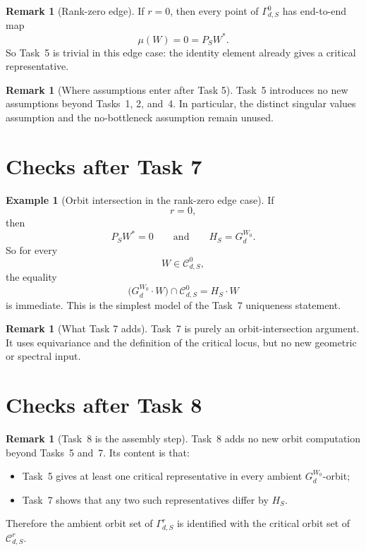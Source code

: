 \documentclass{article}
\theoremstyle{definition}
\newtheorem{remark}[theorem]{Remark}
\newtheorem{example}[theorem]{Example}
\begin{document}
\begin{remark}[Rank-zero edge]
If $r=0$, then every point of $\Gamma_{d,S}^0$ has end-to-end map
\[
\mu(W)=0=P_SW^\ast.
\]
So Task~5 is trivial in this edge case: the identity element already gives a
critical representative.
\end{remark}

\begin{remark}[Where assumptions enter after Task 5]
Task~5 introduces no new assumptions beyond Tasks~1, 2, and~4. In particular,
the distinct singular values assumption and the no-bottleneck assumption remain
unused.
\end{remark}

\section{Checks after Task 7}

\begin{example}[Orbit intersection in the rank-zero edge case]
If
\[
r=0,
\]
then
\[
P_SW^\ast=0
\qquad\text{and}\qquad
H_S=G_d^{W_0}.
\]
So for every
\[
W\in \mathcal C_{d,S}^0,
\]
the equality
\[
\bigl(G_d^{W_0}\cdot W\bigr)\cap \mathcal C_{d,S}^0
=
H_S\cdot W
\]
is immediate. This is the simplest model of the Task~7 uniqueness statement.
\end{example}

\begin{remark}[What Task 7 adds]
Task~7 is purely an orbit-intersection argument. It uses equivariance and the
definition of the critical locus, but no new geometric or spectral input.
\end{remark}

\section{Checks after Task 8}

\begin{remark}[Task~8 is the assembly step]
Task~8 adds no new orbit computation beyond Tasks~5 and~7. Its content is that:
\begin{itemize}
\item Task~5 gives at least one critical representative in every ambient
$G_d^{W_0}$-orbit;
\item Task~7 shows that any two such representatives differ by $H_S$.
\end{itemize}
Therefore the ambient orbit set of $\Gamma_{d,S}^r$ is identified with the
critical orbit set of $\mathcal C_{d,S}^r$.
\end{remark}
\end{document}
